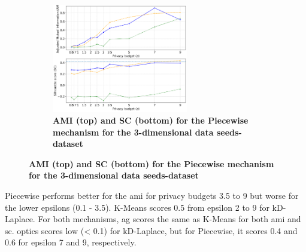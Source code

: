 \begin{figure}[H]
\begin{subfigure}{1\textwidth}
    \caption{\textbf{AMI (top) and SC (bottom) for the Piecewise mechanism for the 3-dimensional data seeds-dataset}}
    \centering
    \includegraphics[width=0.65\textwidth]{Results/kd-laplace/piecewise/seeds-dataset/ami-and-sc_3_dimensions.png}
  \end{subfigure}
  \label{fig:validation-seeds-dataset_comparison_3d-laplace}
\end{figure}
Piecewise performs better for the \gls{ami} for privacy budgets 3.5 to 9 but worse for the lower epsilons (0.1 - 3.5).
K-Means scores 0.5 from epsilon 2 to 9 for kD-Laplace.
For both mechanisms, \gls{ag} scores the same as K-Means for both \gls{ami} and \gls{sc}.
\gls{optics} scores low (< 0.1) for kD-Laplace, but for Piecewise, it scores 0.4 and 0.6 for epsilon 7 and 9, respectively.
\newpage

